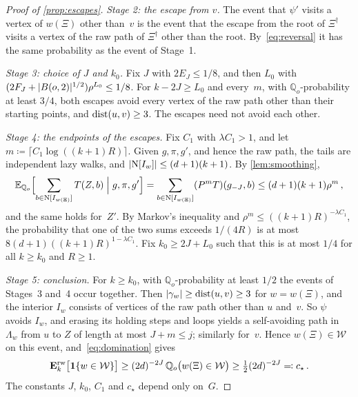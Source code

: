 \begin{proof}[Proof of \cref{prop:escapes}]
\emph{Stage 2: the escape from $v$.} The event that $\psi'$ visits a vertex of $w(\Xi)$ other than~$v$ is
the event that the escape from the root of $\Xi^\dagger$ visits a vertex of the raw path of $\Xi^\dagger$
other than the root. By~\eqref{eq:reversal} it has the same probability as the event of Stage~1.

\emph{Stage 3: choice of $J$ and $k_0$.} Fix $J$ with $2E_J\le1/8$, and then $L_0$ with
$(2F_J+\lvert B(o,2)\rvert^{1/2})\rho^{L_0}\le1/8$. For $k-2J\ge L_0$ and every~$m$, with
$\mathbb Q_o$-probability at least $3/4$, both escapes avoid every vertex of the raw path other than
their starting points, and $\operatorname{dist}(u,v)\ge3$. The escapes need not avoid each other.

\emph{Stage 4: the endpoints of the escapes.} Fix $C_1$ with $\lambda C_1>1$, and let
$m\coloneqq\lceil C_1\log((k+1)R)\rceil$. Given $g,\pi,g'$, and hence the raw path, the tails are
independent lazy walks, and $\lvert\mathrm{N}[I_w]\rvert\le(d+1)(k+1)$. By \cref{lem:smoothing},
\begin{equation*}
  \mathbb E_{\mathbb Q_o}\Bigl[\sum_{b\in\mathrm{N}[I_{w(\Xi)}]}T(Z,b)\Bigm|g,\pi,g'\Bigr]
  =\sum_{b\in\mathrm{N}[I_{w(\Xi)}]}(P^mT)(g_{-J},b)\le(d+1)(k+1)\rho^m\,,
\end{equation*}
and the same holds for~$Z'$. By Markov's inequality and $\rho^m\le((k+1)R)^{-\lambda C_1}$, the
probability that one of the two sums exceeds $1/(4R)$ is at most
$8(d+1)((k+1)R)^{1-\lambda C_1}$. Fix $k_0\ge2J+L_0$ such that this is at most $1/4$ for all
$k\ge k_0$ and $R\ge1$.

\emph{Stage 5: conclusion.} For $k\ge k_0$, with $\mathbb Q_o$-probability at least $1/2$ the events of
Stages~3 and~4 occur together. Then $\lvert\gamma_w\rvert\ge\operatorname{dist}(u,v)\ge3$ for $w=w(\Xi)$, and the interior
$I_w$ consists of vertices of the raw path other than $u$ and~$v$. So $\psi$ avoids $I_w$, and erasing its
holding steps and loops yields a self-avoiding path in $\Lambda_w$ from $u$ to $Z$ of length at most
$J+m\le j$; similarly for~$v$. Hence $w(\Xi)\in\mathcal W$ on this event, and~\eqref{eq:domination}
gives
\begin{equation*}
  \mathbf{E}^{\mathrm{rw}}_{k}\bigl[\mathbf{1}\{w\in\mathcal W\}\bigr]\ge(2d)^{-2J}\,\mathbb Q_o\bigl(w(\Xi)\in\mathcal W\bigr)
  \ge\tfrac12(2d)^{-2J}\eqqcolon c_\star\,.
\end{equation*}
The constants $J$, $k_0$, $C_1$ and $c_\star$ depend only on~$G$.
\end{proof}
